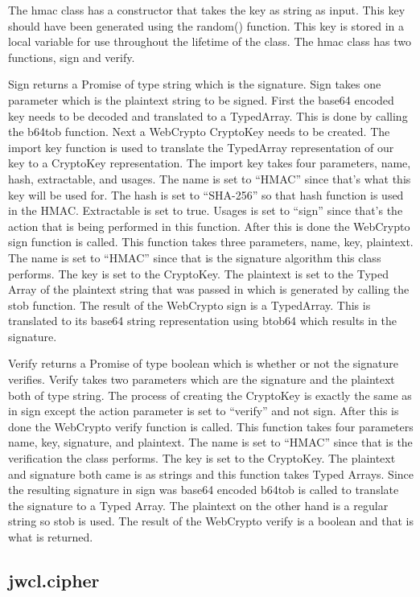 The hmac class has a constructor that takes the key as string as input. This key should have been generated using the random() function. This key is stored in a local variable for use throughout the lifetime of the class. The hmac class has two functions, sign and verify.


Sign returns a Promise of type string which is the signature. Sign takes one parameter which is the plaintext string to be signed. First the base64 encoded key needs to be decoded and translated to a TypedArray. This is done by calling the b64tob function. Next a WebCrypto CryptoKey needs to be created. The import key function is used to translate the TypedArray representation of our key to a CryptoKey representation. The import key takes four parameters, name, hash, extractable, and usages. The name is set to “HMAC” since that's what this key will be used for. The hash is set to “SHA-256” so that hash function is used in the HMAC. Extractable is set to true. Usages is set to “sign” since that's the action that is being performed in this function. After this is done the WebCrypto sign function is called. This function takes three parameters, name, key, plaintext. The name is set to “HMAC” since that is the signature algorithm this class performs. The key is set to the CryptoKey. The plaintext is set to the Typed Array of the plaintext string that was passed in which is generated by calling the stob function. The result of the WebCrypto sign is a TypedArray. This is translated to its base64 string representation using btob64 which results in the signature.

Verify returns a Promise of type boolean which is whether or not the signature verifies. Verify takes two parameters which are the signature and the plaintext both of type string. The process of creating the CryptoKey is exactly the same as in sign except the action parameter is set to “verify” and not sign. After this is done the WebCrypto verify function is called. This function takes four parameters name, key, signature, and plaintext. The name is set to “HMAC” since that is the verification the class performs. The key is set to the CryptoKey. The plaintext and signature both came is as strings and this function takes Typed Arrays. Since the resulting signature in sign was base64 encoded b64tob is called to translate the signature to a Typed Array. The plaintext on the other hand is a regular string so stob is used. The result of the WebCrypto verify is a boolean and that is what is returned.


\subsection{jwcl.cipher}


